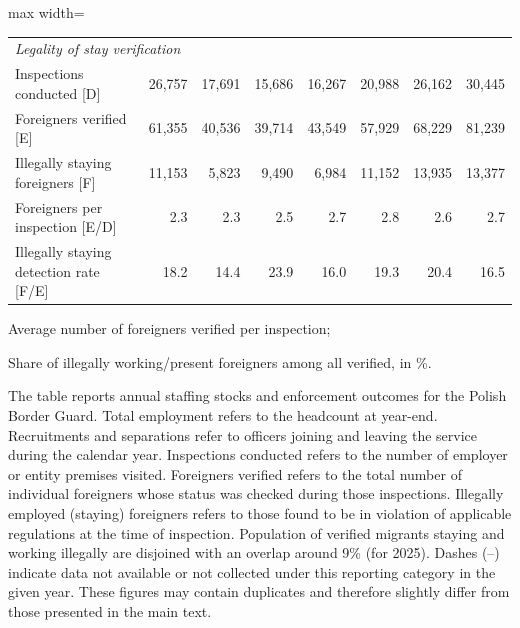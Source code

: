 \begin{table}[H]
{\begin{adjustbox}{max width=\textwidth}
\begin{threeparttable}
\begin{tabular}{lrrrrrrr}
\midrule
\multicolumn{8}{l}{\textit{Legality of stay verification}} \\[2pt]
\quad Inspections conducted [D]                        & 26,757 & 17,691 & 15,686 & 16,267 & 20,988 & 26,162 & 30,445 \\
\quad Foreigners verified [E]                          & 61,355 & 40,536 & 39,714 & 43,549 & 57,929 & 68,229 & 81,239 \\
\quad Illegally staying foreigners [F]                 & 11,153 & 5,823 & 9,490 & 6,984 & 11,152 & 13,935 & 13,377 \\
\quad Foreigners per inspection [E/D]\tnote{a}         &    2.3 &    2.3 &    2.5 &    2.7 &    2.8 &    2.6 &    2.7 \\
\quad Illegally staying detection rate [F/E]\tnote{b}  &   18.2 &   14.4 &   23.9 &   16.0 &   19.3 &   20.4 &   16.5 \\
\bottomrule
\end{tabular}
\begin{tablenotes}
\small
\item[a] Average number of foreigners verified per inspection;
\item[b] Share of illegally working/present foreigners among all verified, in \%.

The table reports annual staffing stocks and enforcement outcomes for the Polish Border Guard. Total employment refers to the headcount at year-end. Recruitments and separations refer to officers joining and leaving the service during the calendar year. Inspections conducted refers to the number of employer or entity premises visited. Foreigners verified refers to the total number of individual foreigners whose status was checked during those inspections. Illegally employed (staying) foreigners refers to those found to be in violation of applicable regulations at the time of inspection. Population of verified migrants staying and working illegally are disjoined with an overlap around 9\% (for 2025). Dashes (--) indicate data not available or not collected under this reporting category in the given year. These figures may contain duplicates and therefore slightly differ from those presented in the main text.
\end{tablenotes}
\end{threeparttable}
\end{adjustbox}

}

\end{table}%

\clearpage

